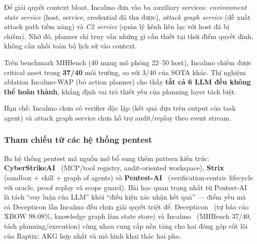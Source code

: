 Để giải quyết context bloat, Incalmo đưa vào ba auxiliary services: \emph{environment state service} (host, service, credential đã thu được), \emph{attack graph service} (đề xuất attack path tiềm năng) và \emph{C2 service} (quản lý kênh liên lạc với host đã bị chiếm). Nhờ đó, planner chỉ truy vấn những gì cần thiết tại thời điểm quyết định, không cần nhồi toàn bộ lịch sử vào context.

Trên benchmark MHBench (40 mạng mô phỏng 22--50 host), Incalmo chiếm được critical asset trong \textbf{37/40} môi trường, so với 3/40 của SOTA khác. Thí nghiệm ablation Incalmo-WAP (bỏ action planner) cho thấy \textbf{tất cả 6 LLM đều không thể hoàn thành}, khẳng định vai trò thiết yếu của planning layer tách biệt.

Hạn chế: Incalmo chưa có verifier độc lập (kết quả dựa trên output của task agent) và attack graph service chưa hỗ trợ audit/replay theo event stream.

\subsubsection{Tham chiếu từ các hệ thống pentest}

Ba hệ thống pentest mã nguồn mở bổ sung thêm pattern kiến trúc: \textbf{CyberStrikeAI}~\cite{cyberstrike} (MCP/tool registry, audit-oriented workspace), \textbf{Strix}~\cite{strix} (sandbox + skill + graph of agents) và \textbf{Pentest-AI}~\cite{pentestai} (verification-centric lifecycle với oracle, proof replay và scope guard). Bài học quan trọng nhất từ Pentest-AI là tách ``suy luận của LLM'' khỏi ``điều kiện xác nhận kết quả'' --- điểm yếu mà cả Decepticon lẫn Incalmo đều chưa giải quyết triệt để. Decepticon~\cite{decepticon} (tự báo cáo XBOW 98.08\%, knowledge graph làm state store) và Incalmo~\cite{incalmo} (MHBench 37/40, tách planning/execution) cùng nhau cung cấp nền tảng cho hai đóng góp cốt lõi của Raptix: AKG hợp nhất và mô hình khai thác hai pha.

